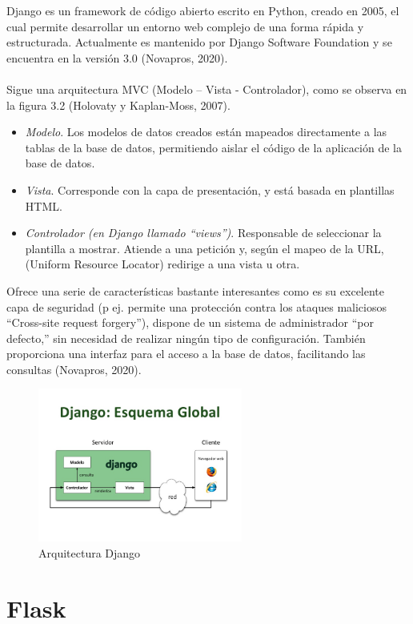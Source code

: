 \documentclass{report}
\begin{document}
Django es un framework de código abierto escrito en Python, creado en 2005, el cual permite desarrollar un entorno web complejo de una forma rápida y estructurada. Actualmente es mantenido por Django Software Foundation y se encuentra en la versión 3.0 (Novapros, 2020).
\\
\\
Sigue una arquitectura MVC (Modelo – Vista - Controlador), como se observa en la figura 3.2 (Holovaty y Kaplan-Moss, 2007).
\begin{itemize}
	\item \textit{Modelo}. Los modelos de datos creados están mapeados directamente a las tablas de la base de datos, permitiendo aislar el código de la aplicación de la base de datos.

	\item \textit{Vista}. Corresponde con la capa de presentación, y está basada en plantillas HTML.		
	\item \textit{Controlador (en Django llamado “views”)}. Responsable de seleccionar la plantilla a mostrar. Atiende a una petición y, según el mapeo de la URL, (Uniform Resource Locator) redirige a una vista u otra.
\end{itemize}
Ofrece una serie de características bastante interesantes como es su excelente capa de seguridad (p ej. permite una protección contra los ataques maliciosos “Cross-site request forgery”), dispone de un sistema de administrador “por defecto,” sin necesidad de realizar ningún tipo de configuración. También proporciona una interfaz para el acceso a la base de datos, facilitando las consultas (Novapros, 2020).
\begin{figure}[h!]
  \centering
    \includegraphics[width=0.6\textwidth]{images/django.png}
  \caption{Arquitectura Django}
  \label{Arquitectura Django}
\end{figure}

\section{Flask}
\end{document}
